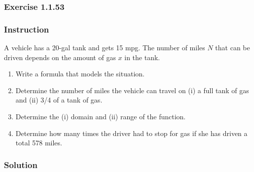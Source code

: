 \subsubsection*{Exercise 1.1.53}

\subsubsection*{Instruction}

A vehicle has a 20-gal tank and gets 15 mpg. The number of miles $ N $ that can be driven depends on the amount of gas $ x $ in the tank.

\begin{enumerate}[label = (\alph*)]
  \item
    Write a formula that models the situation.
  \item
    Determine the number of miles the vehicle can travel on (i) a full tank of gas and (ii) 3/4 of a tank of gas.
  \item
    Determine the (i) domain and (ii) range of the function.
  \item
    Determine how many times the driver had to stop for gas if she has driven a total 578 miles.
\end{enumerate}

\subsubsection*{Solution}

